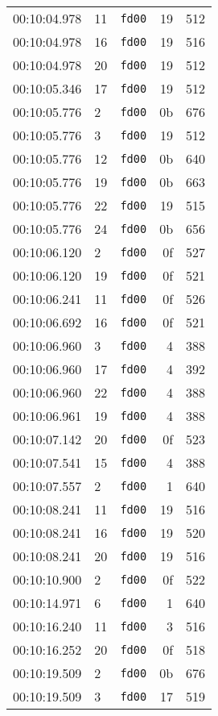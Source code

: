 \documentclass{article}
\begin{document}
\begin{longtable}{lllrr}
00:10:04.978 & 11 & \texttt{fd00} & 19 & 512 \\
00:10:04.978 & 16 & \texttt{fd00} & 19 & 516 \\
00:10:04.978 & 20 & \texttt{fd00} & 19 & 512 \\
00:10:05.346 & 17 & \texttt{fd00} & 19 & 512 \\
00:10:05.776 & 2 & \texttt{fd00} & 0b & 676 \\
00:10:05.776 & 3 & \texttt{fd00} & 19 & 512 \\
00:10:05.776 & 12 & \texttt{fd00} & 0b & 640 \\
00:10:05.776 & 19 & \texttt{fd00} & 0b & 663 \\
00:10:05.776 & 22 & \texttt{fd00} & 19 & 515 \\
00:10:05.776 & 24 & \texttt{fd00} & 0b & 656 \\
00:10:06.120 & 2 & \texttt{fd00} & 0f & 527 \\
00:10:06.120 & 19 & \texttt{fd00} & 0f & 521 \\
00:10:06.241 & 11 & \texttt{fd00} & 0f & 526 \\
00:10:06.692 & 16 & \texttt{fd00} & 0f & 521 \\
00:10:06.960 & 3 & \texttt{fd00} & 4 & 388 \\
00:10:06.960 & 17 & \texttt{fd00} & 4 & 392 \\
00:10:06.960 & 22 & \texttt{fd00} & 4 & 388 \\
00:10:06.961 & 19 & \texttt{fd00} & 4 & 388 \\
00:10:07.142 & 20 & \texttt{fd00} & 0f & 523 \\
00:10:07.541 & 15 & \texttt{fd00} & 4 & 388 \\
00:10:07.557 & 2 & \texttt{fd00} & 1 & 640 \\
00:10:08.241 & 11 & \texttt{fd00} & 19 & 516 \\
00:10:08.241 & 16 & \texttt{fd00} & 19 & 520 \\
00:10:08.241 & 20 & \texttt{fd00} & 19 & 516 \\
00:10:10.900 & 2 & \texttt{fd00} & 0f & 522 \\
00:10:14.971 & 6 & \texttt{fd00} & 1 & 640 \\
00:10:16.240 & 11 & \texttt{fd00} & 3 & 516 \\
00:10:16.252 & 20 & \texttt{fd00} & 0f & 518 \\
00:10:19.509 & 2 & \texttt{fd00} & 0b & 676 \\
00:10:19.509 & 3 & \texttt{fd00} & 17 & 519 \\

\end{longtable}
\end{document}
